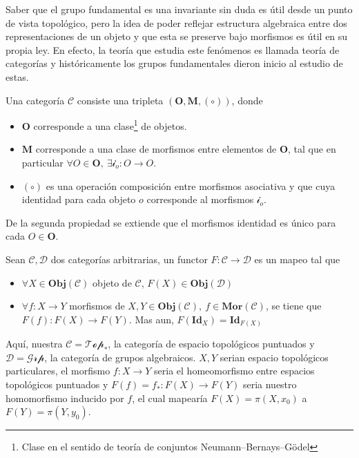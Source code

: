 {Saber que el grupo fundamental es una invariante sin duda es útil
desde un punto de vista topológico, pero la idea de poder reflejar
estructura algebraica entre dos representaciones de un objeto y que esta
se preserve bajo morfismos es útil en su propia ley. En efecto, la
teoría que estudia este fenómenos es llamada teoría de categorías y
históricamente los grupos fundamentales dieron inicio al estudio de
estas.
\begin{definicion}
  Una categoría \(\mathcal C\) consiste una tripleta \(( \mathbf O,
  \mathbf M, (\circ))\), donde
  \begin{itemize}
    \item \(\mathbf O\) corresponde a una clase\footnote{Clase en el sentido de
        teoría de conjuntos Neumann–Bernays–Gödel} de objetos.
    \item \(\mathbf M\) corresponde a una clase de morfismos
      entre elementos de \(\mathbf O\), tal que en particular \(\forall
      O \in \mathbf O,\ \exists \mathcal i _o : O \to O\).
    \item \((\circ)\) es una operación composición entre morfismos
      asociativa y que cuya identidad para cada objeto \(o\) corresponde al
      morfismos \(\mathcal i _o\).
  \end{itemize}
\end{definicion}
De la segunda propiedad se extiende que el morfismos identidad es único
para cada \(O \in \mathbf O\).
\begin{definicion}
  Sean \(\mathscr{C} , \mathscr D\) dos categorías arbitrarias, un
  functor \(F : \mathscr C \to \mathscr D\) es un mapeo tal que
  \begin{itemize}
  \item \(\forall X \in \mathbf{Obj}(\mathscr C)\) objeto de \(\mathscr
    C\), \( F(X) \in \mathbf{Obj} (\mathscr D)\)
  \item  \(\forall f : X \to Y\) morfismos de \(X,Y \in \mathbf{Obj}
    (\mathscr C),\ f \in \mathbf{Mor} (\mathscr C)\), se tiene que \(
    F(f) : F(X) \to F(Y) \). Mas aun, \(F (\mathbf{Id}_X) = \mathbf{Id}_{F(X)}\)
  \end{itemize}
\end{definicion}
Aquí, nuestra \(\mathscr C = \mathscr{Top_{*}}\), la categoría de
espacio topológicos puntuados y \(\mathscr D = \mathscr{Grp}\), la categoría de
grupos algebraicos. \(X,Y\) serian espacio topológicos particulares, el
morfismo \(f : X \to Y\) seria el homeomorfismo entre espacios
topológicos puntuados y \(F(f) = f_{*} : F(X) \to F(Y)\) seria nuestro
homomorfismo inducido por \(f\), el cual mapearía \(F(X) = \pi (X,
x_0)\) a \(F(Y) = \pi (Y, y_0) \).
}